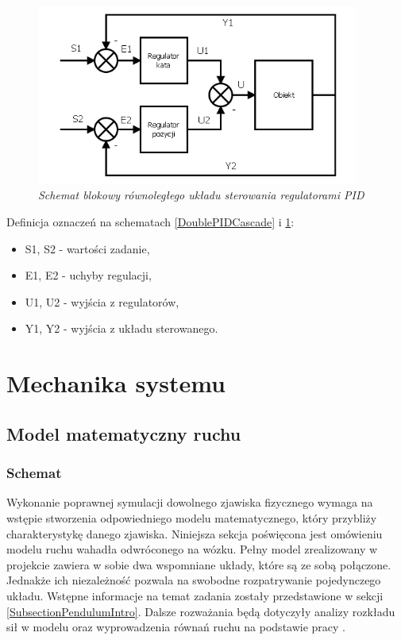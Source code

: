 \documentclass[12pt, twoside, openany]{report}
\theoremstyle{definition}
\begin{document}
\begin{itemize}
\begin{figure}[H]
	\centering
		\includegraphics[width = 300pt]{DoublePIDParallel} 
		\caption{\textit{Schemat blokowy równoległego układu sterowania regulatorami PID\cite{JTJT}}}
		\label{DoublePIDParallel}
\end{figure}
\end{itemize}

Definicja oznaczeń na schematach \ref{DoublePIDCascade} i \ref{DoublePIDParallel}:
\begin{itemize}
\item S1, S2 - wartości zadanie,
\item E1, E2 - uchyby regulacji,
\item U1, U2 - wyjścia z regulatorów,
\item Y1, Y2 - wyjścia z układu sterowanego.
\end{itemize}  

\section{Mechanika systemu}
\subsection{Model matematyczny ruchu}
\label{MathModel}
\subsubsection{Schemat}
Wykonanie poprawnej symulacji dowolnego zjawiska fizycznego wymaga na wstępie stworzenia odpowiedniego modelu matematycznego, który przybliży charakterystykę danego zjawiska. Niniejsza sekcja poświęcona jest omówieniu modelu ruchu wahadła odwróconego na wózku. Pełny model zrealizowany w projekcie zawiera w sobie dwa wspomniane układy, które są ze sobą połączone. Jednakże ich niezależność pozwala na swobodne rozpatrywanie pojedynczego układu. Wstępne informacje na temat zadania zostały przedstawione w sekcji \ref{SubsectionPendulumIntro}. Dalsze rozważania będą dotyczyły analizy rozkładu sił w modelu oraz wyprowadzenia równań ruchu na podstawie pracy \cite{LMIP}.
\end{document}

